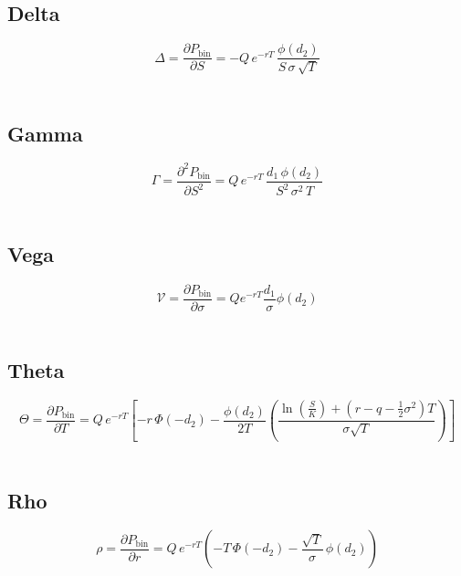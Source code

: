 \documentclass[12pt,a4paper]{article}
\begin{document}
\subsection{Delta}
\[
  \boxed{\Delta = \frac{\partial P_{\mathrm{bin}}}{\partial S}
  = -Q\, e^{-rT}\, \frac{\phi(d_2)}{S\,\sigma\,\sqrt{T}}}
\]

\[
  \begin{aligned}
  \end{aligned}
\]

\subsection{Gamma}
\[
  \boxed{\Gamma = \frac{\partial^2 P_{\mathrm{bin}}}{\partial S^2}
  = Q\, e^{-rT}\, \frac{d_1\,\phi(d_2)}{S^2\,\sigma^2\,T}}
\]

\[
  \begin{aligned}
  \end{aligned}
\]

\subsection{Vega}
\[
  \boxed{\mathcal{V} = \frac{\partial P_{\mathrm{bin}}}{\partial \sigma} = Qe^{-rT}\frac{d_1}{\sigma}\phi(d_2)}
\]

\[
  \begin{aligned}
  \end{aligned}
\]

\subsection{Theta}
\[
  \boxed{\Theta = \frac{\partial P_{\mathrm{bin}}}{\partial T} = Q\, e^{-rT}\!\left[-r\,\Phi(-d_2)- \frac{\phi(d_2)}{2T}\left(\frac{\ln(\tfrac{S}{K}) + (r - q - \tfrac{1}{2}\sigma^2)T}{\sigma\sqrt{T}}\right)\right]}
\]

\[
  \begin{aligned}
  \end{aligned}
\]

\subsection{Rho}
\[
  \boxed{\rho = \frac{\partial P_{\mathrm{bin}}}{\partial r}
  = Q\, e^{-rT}\!\left(
    -T\,\Phi(-d_2)
    - \frac{\sqrt{T}}{\sigma}\,\phi(d_2)
  \right)}
\]

\[
  \begin{aligned}
  \end{aligned}
\]
\end{document}
